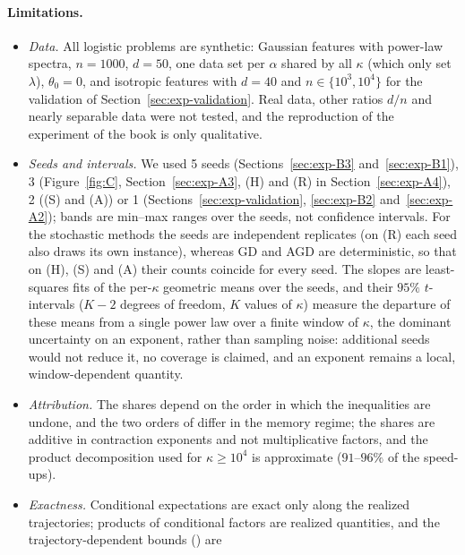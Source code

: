 \paragraph{Limitations.}
\begin{itemize}[leftmargin=1.4em,itemsep=1pt,topsep=2pt]
\item \emph{Data.} All logistic problems are synthetic: Gaussian features with power-law spectra, $n=1000$, $d=50$,
one data set per $\alpha$ shared by all $\kappa$ (which only set $\lambda$), $\theta_0=0$, and isotropic features with
$d=40$ and $n\in\{10^3,10^4\}$ for the validation of Section~\ref{sec:exp-validation}. Real data, other ratios $d/n$ and
nearly separable data were not tested, and the reproduction of the experiment of the book is only qualitative.
\item \emph{Seeds and intervals.} We used 5 seeds (Sections~\ref{sec:exp-B3} and~\ref{sec:exp-B1}), 3
(Figure~\ref{fig:C}, Section~\ref{sec:exp-A3}, (H) and (R) in Section~\ref{sec:exp-A4}), 2 ((S) and (A)) or 1
(Sections~\ref{sec:exp-validation}, \ref{sec:exp-B2} and~\ref{sec:exp-A2}); bands are min--max ranges over the seeds,
not confidence intervals. For the stochastic methods the seeds are independent replicates (on (R) each seed also draws
its own instance), whereas GD and AGD are deterministic, so that on (H), (S) and (A) their counts coincide for every
seed. The slopes are least-squares fits of the per-$\kappa$ geometric means over the seeds, and their $95\%$
$t$-intervals ($K-2$ degrees of freedom, $K$ values of $\kappa$) measure the departure of these means from a single
power law over a finite window of $\kappa$, the dominant uncertainty on an exponent, rather than sampling noise:
additional seeds would not reduce it, no coverage is claimed, and an exponent remains a local, window-dependent
quantity.
\item \emph{Attribution.} The shares depend on the order in which the inequalities are undone, and the two orders of
 differ in the memory regime; the shares are additive in contraction exponents and not
multiplicative factors, and the product decomposition used for $\kappa\ge10^4$ is approximate ($91$--$96\%$ of the
speed-ups).
\item \emph{Exactness.} Conditional expectations are exact only along the realized trajectories; products of
conditional factors are realized quantities, and the trajectory-dependent bounds () are

\end{itemize}
